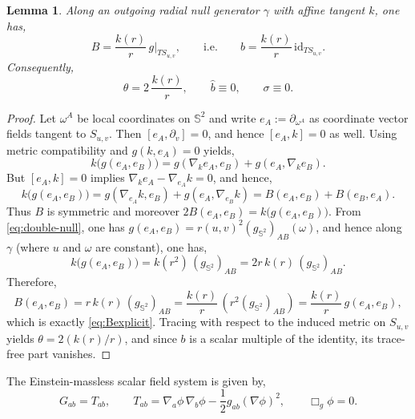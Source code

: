 \documentclass[a4paper, reqno]{amsart}
\numberwithin{equation}{section}
\theoremstyle{plain}
\newtheorem{lemma}[theorem]{Lemma}
\theoremstyle{definition}
\theoremstyle{remark}
\begin{document}
\begin{lemma}\label{lem:Bexplicit}
Along an outgoing radial null generator $\gamma$ with affine tangent $k$, one has,
\begin{equation}\label{eq:Bexplicit}
B = \frac{k(r)}{r}\,g\big|_{T S_{u,v}},
\qquad\text{i.e.}\qquad
b = \frac{k(r)}{r}\,\mathrm{id}_{T S_{u,v}}.
\end{equation}
Consequently,
\begin{equation}\label{eq:theta-shear}
\theta = 2\,\frac{k(r)}{r},
\qquad
\hat b \equiv 0,
\qquad
\sigma\equiv 0.
\end{equation}
\end{lemma}
\begin{proof}
Let $\omega^A$ be local coordinates on $\mathbb S^2$ and write $e_A:=\partial_{\omega^A}$ as coordinate vector fields tangent to $S_{u,v}$. Then $[e_A,\partial_v]=0$, and hence $[e_A,k]=0$ as well. Using metric compatibility and $g(k,e_A)=0$ yields,
$$ k\big(g(e_A,e_B)\big)= g(\nabla_k e_A,e_B)+g(e_A,\nabla_k e_B).$$
But $[e_A,k]=0$ implies $\nabla_k e_A-\nabla_{e_A}k=0$, and hence,
$$k\big(g(e_A,e_B)\big)= g(\nabla_{e_A}k,e_B)+g(e_A,\nabla_{e_B}k)=B(e_A,e_B)+B(e_B,e_A).$$
Thus $B$ is symmetric and moreover $2B(e_A,e_B)=k\big(g(e_A,e_B)\big).$ From \eqref{eq:double-null}, one has $g(e_A,e_B)=r(u,v)^2(g_{\mathbb{S}^2})_{AB}(\omega)$, and hence along $\gamma$ (where $u$ and $\omega$
are constant), one has,
$$ k\big(g(e_A,e_B)\big)=k(r^2)\,(g_{\mathbb{S}^2})_{AB}=2r\,k(r)\,(g_{\mathbb{S}^2})_{AB}.$$
Therefore,
$$B(e_A,e_B)= r\,k(r)\,(g_{\mathbb{S}^2})_{AB} = \frac{k(r)}{r}\,(r^2(g_{\mathbb{S}^2})_{AB})= \frac{k(r)}{r}\,g(e_A,e_B),$$
which is exactly \eqref{eq:Bexplicit}. Tracing with respect to the induced metric on $S_{u,v}$ yields $\theta = 2(k(r)/r)$, and since $b$ is a scalar multiple of the identity, its trace-free part vanishes.

\end{proof}

The Einstein-massless scalar field system is given by,
$$
G_{ab}= T_{ab},
\qquad
T_{ab}=\nabla_a\phi\,\nabla_b\phi - \frac12 g_{ab}(\nabla\phi)^2,
\qquad
\Box_g\phi=0.
$$
\end{document}
